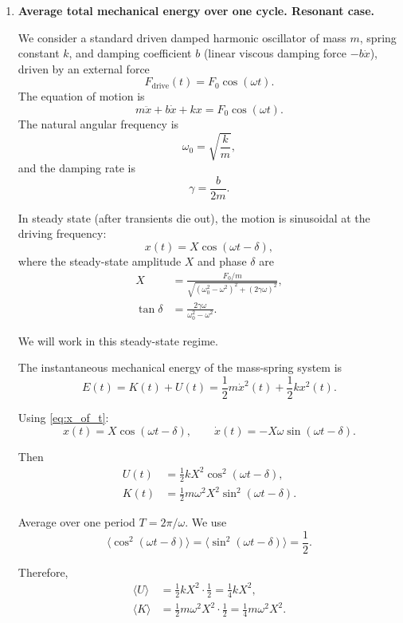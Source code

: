 \documentclass[12pt]{article}
\begin{document}
\begin{enumerate}

\item \textbf{Average total mechanical energy over one cycle. Resonant case.}

We consider a standard driven damped harmonic oscillator of mass $m$, spring constant $k$, and damping coefficient $b$ (linear viscous damping force $-b\dot{x}$), driven by an external force
\[
F_\text{drive}(t) = F_0 \cos(\omega t).
\]
The equation of motion is
\begin{equation}
m \ddot{x} + b \dot{x} + k x = F_0 \cos(\omega t).
\label{eq:eom}
\end{equation}
The natural angular frequency is
\[
\omega_0 = \sqrt{\frac{k}{m}},
\]
and the damping rate is
\[
\gamma = \frac{b}{2m}.
\]

In steady state (after transients die out), the motion is sinusoidal at the driving frequency:
\begin{equation}
x(t) = X \cos(\omega t - \delta),
\label{eq:x_of_t}
\end{equation}
where the steady-state amplitude $X$ and phase $\delta$ are
\begin{align}
X &= \frac{F_0/m}{\sqrt{(\omega_0^2 - \omega^2)^2 + (2\gamma \omega)^2}}, \\
\tan \delta &= \frac{2\gamma \omega}{\omega_0^2 - \omega^2}.
\end{align}

We will work in this steady-state regime.





The instantaneous mechanical energy of the mass-spring system is
\begin{equation}
E(t) = K(t) + U(t)
= \frac{1}{2} m \dot{x}^2(t) + \frac{1}{2} k x^2(t).
\label{eq:Et}
\end{equation}

Using \eqref{eq:x_of_t}:
\[
x(t) = X \cos(\omega t - \delta),
\qquad
\dot{x}(t) = -X \omega \sin(\omega t - \delta).
\]

Then
\begin{align}
U(t) &= \frac{1}{2} k X^2 \cos^2(\omega t - \delta), \\
K(t) &= \frac{1}{2} m \omega^2 X^2 \sin^2(\omega t - \delta).
\end{align}

Average over one period $T = 2\pi/\omega$.
We use
\[
\langle \cos^2(\omega t - \delta) \rangle = \langle \sin^2(\omega t - \delta) \rangle = \frac{1}{2}.
\]

Therefore,
\begin{align}
\langle U \rangle 
&= \frac{1}{2} k X^2 \cdot \frac{1}{2}
= \frac{1}{4} k X^2, \\
\langle K \rangle
&= \frac{1}{2} m \omega^2 X^2 \cdot \frac{1}{2}
= \frac{1}{4} m \omega^2 X^2.
\end{align}


\end{enumerate}
\end{document}
